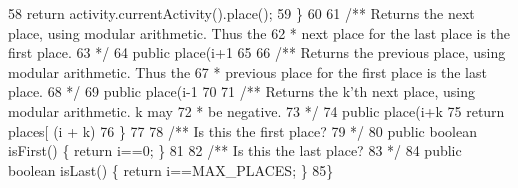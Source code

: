 \begin{tightcode}
\quad\num{58}	return activity.currentActivity().place();
\quad\num{59}    \}
\quad\num{60}
\quad\num{61}    /** Returns the next place, using modular arithmetic. Thus the
\quad\num{62}     * next place for the last place is the first place.
\quad\num{63}     */
\quad\num{64}    public place(i+1 %
\quad\num{65}
\quad\num{66}    /** Returns the previous place, using modular arithmetic. Thus the
\quad\num{67}     * previous place for the first place is the last place.
\quad\num{68}     */
\quad\num{69}    public place(i-1 %
\quad\num{70}
\quad\num{71}    /** Returns the k'th next place, using modular arithmetic. k may
\quad\num{72}     * be negative.
\quad\num{73}     */
\quad\num{74}    public place(i+k %
\quad\num{75}	return places[ (i + k) %
\quad\num{76}    \}
\quad\num{77}
\quad\num{78}    /**  Is this the first place?
\quad\num{79}     */
\quad\num{80}    public boolean isFirst() \{ return i==0; \}
\quad\num{81}
\quad\num{82}    /** Is this the last place?
\quad\num{83}     */
\quad\num{84}    public boolean isLast() \{ return i==MAX\_PLACES; \}
\quad\num{85}\}
\end{tightcode}
